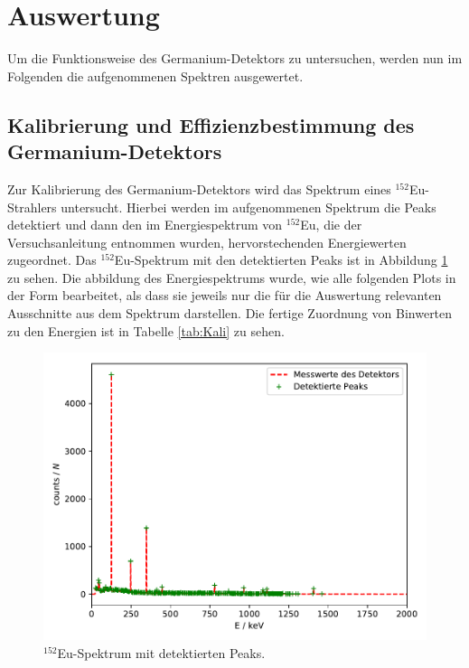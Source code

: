 \section{Auswertung}
Um die Funktionsweise des Germanium-Detektors zu untersuchen, werden nun im Folgenden die aufgenommenen Spektren ausgewertet.

\subsection{Kalibrierung und Effizienzbestimmung des Germanium-Detektors}

Zur Kalibrierung des Germanium-Detektors wird das Spektrum eines $^{152}$Eu-Strahlers untersucht. Hierbei
werden im aufgenommenen Spektrum die Peaks detektiert und dann den im Energiespektrum von $^{152}$Eu, die der
Versuchsanleitung \cite{Q1} entnommen wurden, hervorstechenden Energiewerten zugeordnet. Das
$^{152}$Eu-Spektrum mit den detektierten Peaks ist in
Abbildung \ref{abb:Europiumspektrum} zu sehen. Die abbildung des Energiespektrums wurde, wie alle folgenden Plots in der Form bearbeitet, als
dass sie jeweils nur die für die Auswertung relevanten Ausschnitte aus dem Spektrum darstellen.
Die fertige Zuordnung von Binwerten zu den Energien ist in Tabelle \ref{tab:Kali} zu sehen.
\FloatBarrier
\begin{figure}
    \centering
    \includegraphics[scale=0.7]{Detektormesswerte.pdf}
    \caption{$^{152}$Eu-Spektrum mit detektierten Peaks.}
    \label{abb:Europiumspektrum}
\end{figure}
\FloatBarrier

